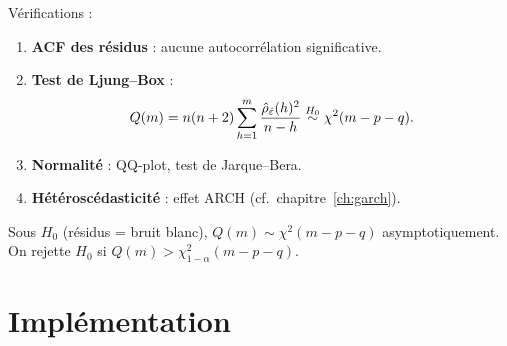 V\'erifications :
\begin{enumerate}
\item \textbf{ACF des r\'esidus} : aucune autocorr\'elation significative.
\item \textbf{Test de Ljung--Box} :
\[
Q(m) = n(n+2)\sum_{h=1}^m\frac{\hat{\rho}_{\hat{\varepsilon}}(h)^2}{n-h} \stackrel{H_0}{\sim}\chi^2(m-p-q).
\]
\item \textbf{Normalit\'e} : QQ-plot, test de Jarque--Bera.
\item \textbf{H\'et\'erosc\'edasticit\'e} : effet ARCH (cf.\ chapitre~\ref{ch:garch}).
\end{enumerate}

\begin{theoreme}
Sous $H_0$ (r\'esidus = bruit blanc), $Q(m)\sim\chi^2(m-p-q)$ asymptotiquement. On rejette $H_0$ si $Q(m)>\chi^2_{1-\alpha}(m-p-q)$.
\end{theoreme}

\section{Impl\'ementation}

